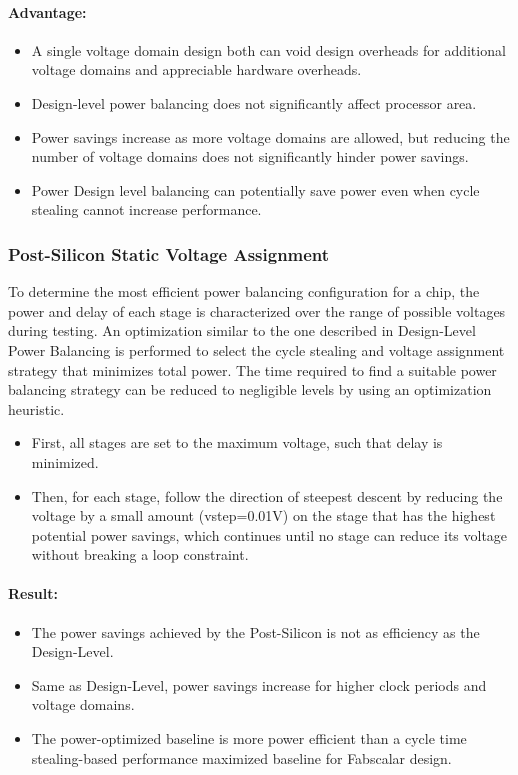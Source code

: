 \documentclass{article}
\begin{document}
\paragraph{Advantage:}
\begin{itemize}
    \item A single voltage domain design both can void design overheads for additional voltage domains and appreciable hardware overheads.
    \item Design-level power balancing does not significantly affect processor area.
    \item Power savings increase as more voltage domains are allowed, but reducing the number of voltage
    domains does not significantly hinder power savings.
    \item Power Design level balancing can potentially save power even when cycle stealing cannot increase performance.
\end{itemize}
\subsubsection{Post-Silicon Static Voltage Assignment}
To determine the most efficient power balancing configuration for a chip, the power and delay of each stage is characterized over the range of possible voltages during testing. An optimization similar to the one described in Design-Level Power Balancing is performed to select the cycle stealing and voltage assignment strategy that minimizes total power. The time required to find a suitable power balancing strategy can be reduced to negligible levels by using an optimization heuristic.\\
\begin{itemize}
	\item  First, all stages are set to the maximum voltage, such that delay is minimized. 
	\item Then, for each stage, follow the direction of steepest descent by reducing the voltage by a small amount (vstep=0.01V) on the stage that has the highest potential power savings, which continues until no stage can reduce its voltage without breaking a loop constraint. 
\end{itemize}
\paragraph{Result:} 
\begin{itemize}
    \item The power savings achieved by the Post-Silicon is not as efficiency as the Design-Level.
    \item Same as Design-Level, power savings increase for higher clock periods and voltage domains.
    \item  The power-optimized baseline is more power efficient than a cycle time stealing-based performance maximized baseline for Fabscalar design.
\end{itemize}
\end{document}
